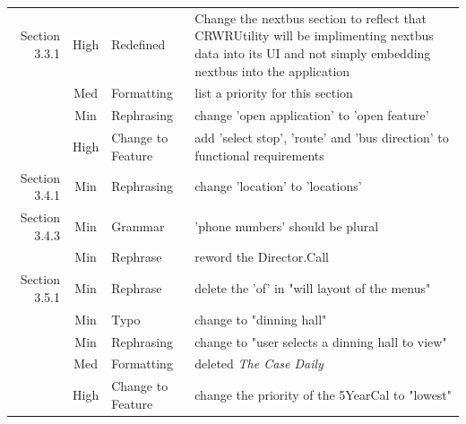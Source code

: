 \documentclass[pdftex,12pt,letter]{article}
\begin{document}
\begin{flushleft}
{\begin{tabular}{|r|c|l|p{6cm}|}
\end{tabular}
}

\newpage

\begin{tabular}{|r|c|l|p{6cm}|}
\hline
Section 3.3.1 & High & Redefined & Change the nextbus section to reflect that CRWRUtility will be implimenting nextbus data into its UI and not simply embedding nextbus into the application\\
& Med & Formatting & list a priority for this section\\
& Min & Rephrasing & change 'open application' to 'open feature'\\
& High & Change to Feature & add 'select stop', 'route' and 'bus direction'  to functional requirements\\
\hline
Section 3.4.1 & Min & Rephrasing & change 'location' to 'locations'\\
\hline
Section 3.4.3 & Min & Grammar & 'phone numbers' should be plural\\
& Min & Rephrase & reword the Director.Call \\
\hline
Section 3.5.1 & Min & Rephrase & delete the 'of' in "will layout of the menus"\\
& Min & Typo & change to "dinning hall"\\
& Min & Rephrasing & change to "user selects a dinning hall to view"\\
& Med & Formatting & deleted \textit{The Case Daily}\\
& High & Change to Feature & change the priority of the 5YearCal to "lowest"\\
\hline

\end{tabular}


\end{flushleft}

\end{document}
